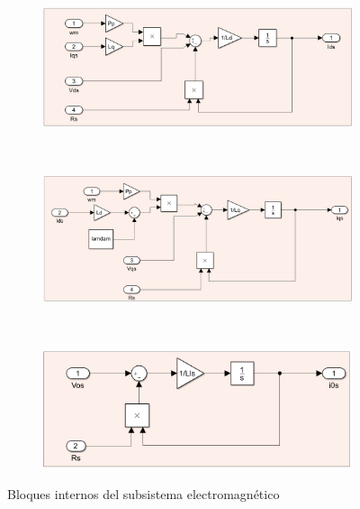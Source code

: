\documentclass{article}
\begin{document}
\begin{figure}[H]
    \centering
    \begin{subfigure}[]{0.8\textwidth}
        \centering
        \includegraphics[width=1\textwidth]{sub_electromagentico4.png}
    \end{subfigure}
    \\
    \begin{subfigure}[b]{0.8\textwidth}
        \centering
        \includegraphics[width=1\textwidth]{sub_electromagentico3.png}
    \end{subfigure}
    \\
    \begin{subfigure}[b]{0.8\textwidth}
        \centering
        \includegraphics[width=1\textwidth]{sub_electromagentico2.png}
    \end{subfigure}
    \caption{Bloques internos del subsistema electromagnético}
\end{figure}

\end{document}
